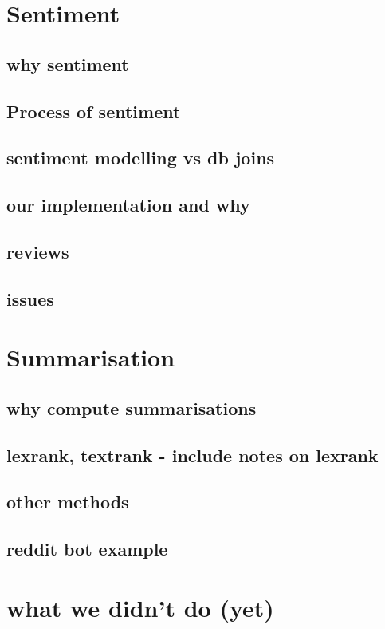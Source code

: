 \documentclass[11pt, a4paper, oneside]{report}
\begin{document}
\section{Sentiment}
\label{sec:sentiment}

\subsection{why sentiment}
\subsection{Process of sentiment}
\subsection{sentiment modelling vs db joins}
\subsection{our implementation and why}
\subsection{reviews}
\subsection{issues}

\section{Summarisation}
\label{sec:summarisation}

\subsection{why compute summarisations}
\subsection{lexrank, textrank - include notes on lexrank}
\subsection{other methods}
\subsection{reddit bot example}

\section{what we didn't do (yet)}
\label{sec:what-we-didnt}
\end{document}
